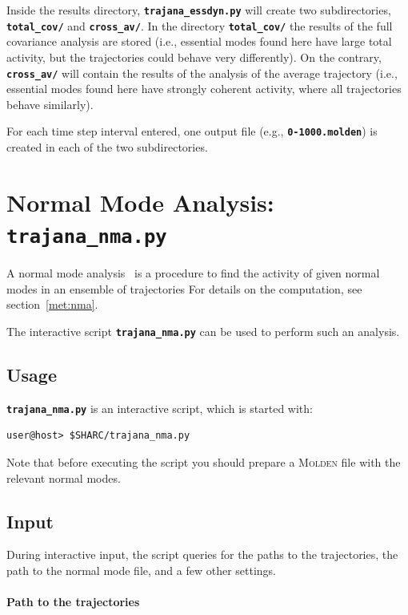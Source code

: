 \documentclass[a4paper,10pt,DIV=15,openany]{scrbook}
\newcommand{\ttt}[1]{\textbf{\texttt{#1}}}
\begin{document}
Inside the results directory, \ttt{trajana\_essdyn.py} will create two subdirectories, \ttt{total\_cov/} and \ttt{cross\_av/}.
In the directory \ttt{total\_cov/} the results of the full covariance analysis are stored (i.e., essential modes found here have large total activity, but the trajectories could behave very differently).
On the contrary, \ttt{cross\_av/} will contain the results of the analysis of the average trajectory (i.e., essential modes found here have strongly coherent activity, where all trajectories behave similarly).

For each time step interval entered, one output file (e.g., \ttt{0-1000.molden}) is created in each of the two subdirectories.





\section{Normal Mode Analysis: \ttt{trajana\_nma.py}}\label{sec:trajana_nma.py}

A normal mode analysis~\cite{Kurtz2001JCP} is a procedure to find the activity of given normal modes in an ensemble of trajectories
For details on the computation, see section~\ref{met:nma}.

The interactive script \ttt{trajana\_nma.py} can be used to perform such an analysis.

\subsection{Usage}

\ttt{trajana\_nma.py} is an interactive script, which is started with:
\begin{verbatim}
user@host> $SHARC/trajana_nma.py
\end{verbatim}
Note that before executing the script you should prepare a \textsc{Molden} file with the relevant normal modes.

\subsection{Input}

During interactive input, the script queries for the paths to the trajectories, the path to the normal mode file, and a few other settings.

\paragraph{Path to the trajectories}
\end{document}
